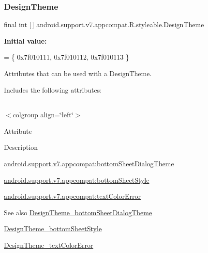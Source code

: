 \subsubsection{\texorpdfstring{Design\+Theme}{DesignTheme}}
{\footnotesize\ttfamily final int \mbox{[}$\,$\mbox{]} android.\+support.\+v7.\+appcompat.\+R.\+styleable.\+Design\+Theme\hspace{0.3cm}{\ttfamily [static]}}

{\bfseries Initial value\+:}
\begin{DoxyCode}
= \{
            0x7f010111, 0x7f010112, 0x7f010113
        \}
\end{DoxyCode}
Attributes that can be used with a Design\+Theme. 

Includes the following attributes\+:

\tabulinesep=1mm
\begin{longtabu} spread 0pt [c]{*{0}{|X[-1]}|}
\hline
\end{longtabu}
$<$colgroup align=\char`\"{}left\char`\"{}$>$ 

Attribute

Description 

{\ttfamily \hyperlink{classandroid_1_1support_1_1v7_1_1appcompat_1_1R_1_1styleable_aae7d45822d51ff4f85632d80246224aa}{android.\+support.\+v7.\+appcompat\+:bottom\+Sheet\+Dialog\+Theme}}

{\ttfamily \hyperlink{classandroid_1_1support_1_1v7_1_1appcompat_1_1R_1_1styleable_a31ceb2d562b5ab39daae25884437ad4c}{android.\+support.\+v7.\+appcompat\+:bottom\+Sheet\+Style}}

{\ttfamily \hyperlink{classandroid_1_1support_1_1v7_1_1appcompat_1_1R_1_1styleable_adc51f4b1386970d13ffffdb5a983b662}{android.\+support.\+v7.\+appcompat\+:text\+Color\+Error}}

\begin{DoxySeeAlso}{See also}
\hyperlink{classandroid_1_1support_1_1v7_1_1appcompat_1_1R_1_1styleable_aae7d45822d51ff4f85632d80246224aa}{Design\+Theme\+\_\+bottom\+Sheet\+Dialog\+Theme} 

\hyperlink{classandroid_1_1support_1_1v7_1_1appcompat_1_1R_1_1styleable_a31ceb2d562b5ab39daae25884437ad4c}{Design\+Theme\+\_\+bottom\+Sheet\+Style} 

\hyperlink{classandroid_1_1support_1_1v7_1_1appcompat_1_1R_1_1styleable_adc51f4b1386970d13ffffdb5a983b662}{Design\+Theme\+\_\+text\+Color\+Error} 
\end{DoxySeeAlso}
\mbox{\label{classandroid_1_1support_1_1v7_1_1appcompat_1_1R_1_1styleable_aae7d45822d51ff4f85632d80246224aa}} 
